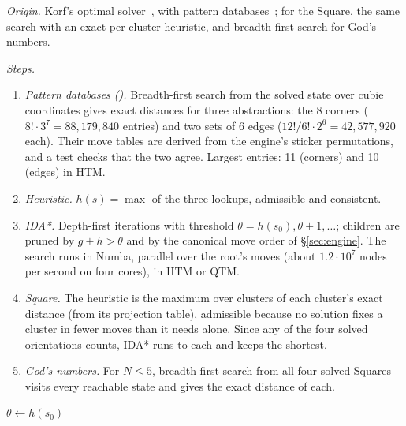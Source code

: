 \emph{Origin.} Korf's optimal  solver~\cite{korf1997optimal}, with pattern databases~\cite{culberson1998pattern};
for the Square, the same search with an exact per-cluster heuristic, and breadth-first search for God's numbers.

\emph{Steps.}
\begin{enumerate}
\item \emph{Pattern databases ().} Breadth-first search from the solved state over cubie coordinates gives exact
  distances for three abstractions: the 8 corners ($8!\cdot3^7=88{,}179{,}840$ entries) and two sets of 6 edges
  ($12!/6!\cdot2^6=42{,}577{,}920$ each). Their move tables are derived from the engine's sticker permutations, and a test
  checks that the two agree. Largest entries: 11 (corners) and 10 (edges) in HTM.
\item \emph{Heuristic.} $h(s)=\max$ of the three lookups, admissible and consistent.
\item \emph{IDA*.} Depth-first iterations with threshold $\theta=h(s_0),\theta+1,\dots$; children are pruned by
  $g+h>\theta$ and by the canonical move order of \S\ref{sec:engine}. The search runs in Numba, parallel over the root's
  moves (about $1.2\cdot10^7$ nodes per second on four cores), in HTM or QTM.
\item \emph{Square.} The heuristic is the maximum over clusters of each cluster's exact distance (from its projection
  table), admissible because no solution fixes a cluster in fewer moves than it needs alone. Since any of the four
  solved orientations counts, IDA* runs to each and keeps the shortest.
\item \emph{God's numbers.} For $N\le5$, breadth-first search from all four solved Squares visits every reachable
  state and gives the exact distance of each.
\end{enumerate}

\begin{algorithm}[t]
\caption{\Mone: IDA* (our reproduction of Korf's solver)}
\label{alg:m1}
\small
{}
$\theta\leftarrow h(s_0)$\;
\end{algorithm}


